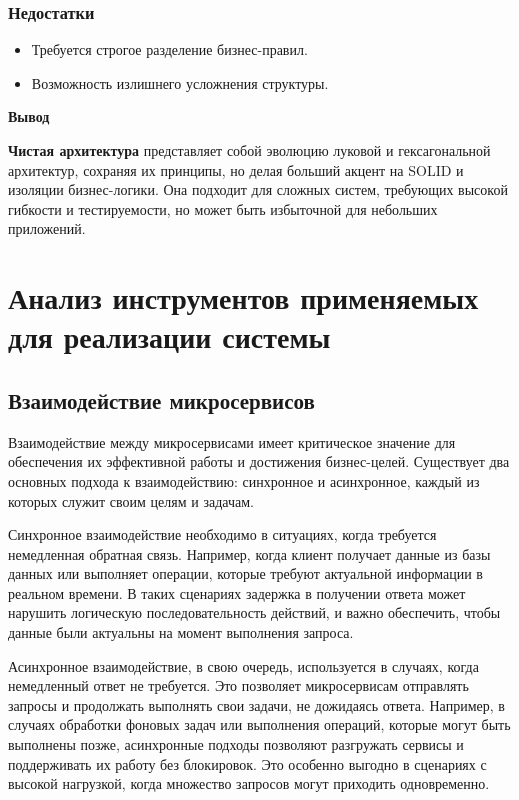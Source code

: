 \subsubsection{Недостатки}
\begin{itemize}
    \item Требуется строгое разделение бизнес-правил.
    \item Возможность излишнего усложнения структуры.
\end{itemize}


\textbf{Вывод}


\textbf{Чистая архитектура} представляет собой эволюцию луковой и гексагональной архитектур, сохраняя их принципы, но делая больший акцент на SOLID и изоляции бизнес-логики. Она подходит для сложных систем, требующих высокой гибкости и тестируемости, но может быть избыточной для небольших приложений.








\section{Анализ инструментов применяемых для реализации системы}

\subsection{Взаимодействие микросервисов} 

Взаимодействие между микросервисами имеет критическое значение для обеспечения их эффективной работы и
достижения бизнес-целей. Существует два основных подхода к взаимодействию: синхронное и асинхронное,
каждый из которых служит своим целям и задачам.

Синхронное взаимодействие необходимо в ситуациях, когда требуется немедленная обратная связь.
Например, когда клиент получает данные из базы данных или выполняет операции, которые требуют
актуальной информации в реальном времени. В таких сценариях задержка в получении ответа может нарушить
логическую последовательность действий, и важно обеспечить, чтобы данные были актуальны на момент выполнения
запроса.

Асинхронное взаимодействие, в свою очередь, используется в случаях, когда немедленный ответ не требуется.
Это позволяет микросервисам отправлять запросы и продолжать выполнять свои задачи, не дожидаясь ответа.
Например, в случаях обработки фоновых задач или выполнения операций, которые могут быть выполнены позже,
асинхронные подходы позволяют разгружать сервисы и поддерживать их работу без блокировок. Это особенно выгодно
в сценариях с высокой нагрузкой, когда множество запросов могут приходить одновременно.

